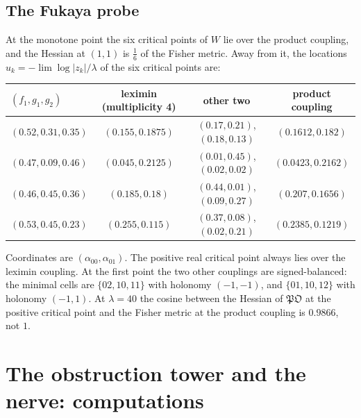 \documentclass[11pt]{article}
\theoremstyle{definition}
\theoremstyle{remark}
\begin{document}
\subsection{The Fukaya probe}\label{sec:openfuk}
At the monotone point the six critical points of $W$ lie over the product coupling, and the Hessian at $(1,1)$ is
$\frac16$ of the Fisher metric. Away from it, the locations $u_k=-\lim\log\lvert z_k\rvert/\lambda$ of the six critical
points are:
\begin{center}\small
\begin{tabular}{@{}lccc@{}}
\toprule
$(f_1,g_1,g_2)$ & leximin (multiplicity 4) & other two & product coupling\\
\midrule
$(0.52,0.31,0.35)$ & $(0.155,0.1875)$ & $(0.17,0.21)$, $(0.18,0.13)$ & $(0.1612,0.182)$\\
$(0.47,0.09,0.46)$ & $(0.045,0.2125)$ & $(0.01,0.45)$, $(0.02,0.02)$ & $(0.0423,0.2162)$\\
$(0.46,0.45,0.36)$ & $(0.185,0.18)$ & $(0.44,0.01)$, $(0.09,0.27)$ & $(0.207,0.1656)$\\
$(0.53,0.45,0.23)$ & $(0.255,0.115)$ & $(0.37,0.08)$, $(0.02,0.21)$ & $(0.2385,0.1219)$\\
\bottomrule
\end{tabular}
\end{center}
Coordinates are $(\alpha_{00},\alpha_{01})$. The positive real critical point always lies over the leximin coupling. At the
first point the two other couplings are signed-balanced: the minimal cells are $\{02,10,11\}$ with holonomy $(-1,-1)$, and
$\{01,10,12\}$ with holonomy $(-1,1)$. At $\lambda=40$ the cosine between the Hessian of $\mathfrak{PO}$ at the positive
critical point and the Fisher metric at the product coupling is $0.9866$, not $1$.

\section{The obstruction tower and the nerve: computations}\label{sec:towercomp}
\end{document}
